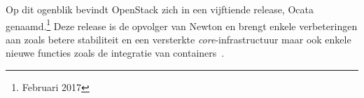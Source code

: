 Op dit ogenblik bevindt OpenStack zich in een vijftiende release, Ocata genaamd.\footnote{Februari 2017} Deze release is de opvolger van Newton en brengt enkele verbeteringen aan zoals betere stabiliteit en een versterkte \textit{core}-infrastructuur maar ook enkele nieuwe functies zoals de integratie van containers~\cite{Cathey2017}.